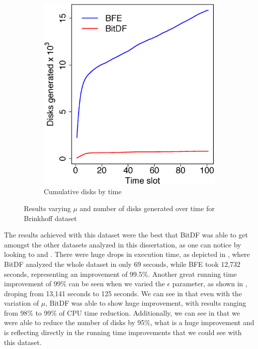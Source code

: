 {\begin{figure}[h!]
\begin{subfigure}[t]{0.48\textwidth}
        \includegraphics[width=\textwidth]{images/Brinkhoff_d.eps}
        \caption{Cumulative disks by time}
        \label{fig:brinkhoff_disks}
    \end{subfigure}
    \caption{Results varying $\mu$ and number of disks generated over time for Brinkhoff dataset}
    \label{fig:brinkhoff_results2}
\end{figure}

The results achieved with this dataset were the best that BitDF was able to get amongst the other datasets analyzed in
this dissertation, as one can notice by looking to  and .
There were huge drops in execution time, as depicted in , where BitDF analyzed the whole
dataset in only 69 seconds, while BFE took 12,732 seconds, representing an improvement of 99.5\%. Another great running
time improvement of 99\% can be seen when we varied the $\epsilon$ parameter, as shown in ,
droping from 13,141 seconds to 125 seconds. We can see in  that even with the variation of
$\mu$, BitDF was able to show huge improvement, with results ranging from 98\% to 99\% of CPU time reduction.
Additionally, we can see in  that we were able to reduce the number of disks by 95\%, what
is a huge improvement and is reflecting directly in the running time improvements that we could see with this dataset.

}
